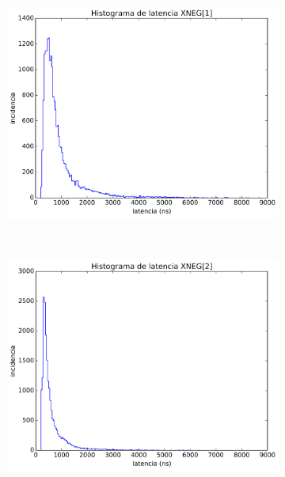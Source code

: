 \begin{figure}[ht!]
\captionsetup[subfigure]{justification=centering}
     \begin{center}
%
        \begin{subfigure}[b]{0.4\textwidth}
        	\includegraphics[width=\textwidth]{figures/ch6_histograma_source_1.png}
		    \caption{}
		    \label{fig:histograma_1}
	    \end{subfigure}
	    ~ %
	    \begin{subfigure}[b]{0.4\textwidth}
	    	\includegraphics[width=\textwidth]{figures/ch6_histograma_source_2.png}

\end{subfigure}
\end{center}
\end{figure}
